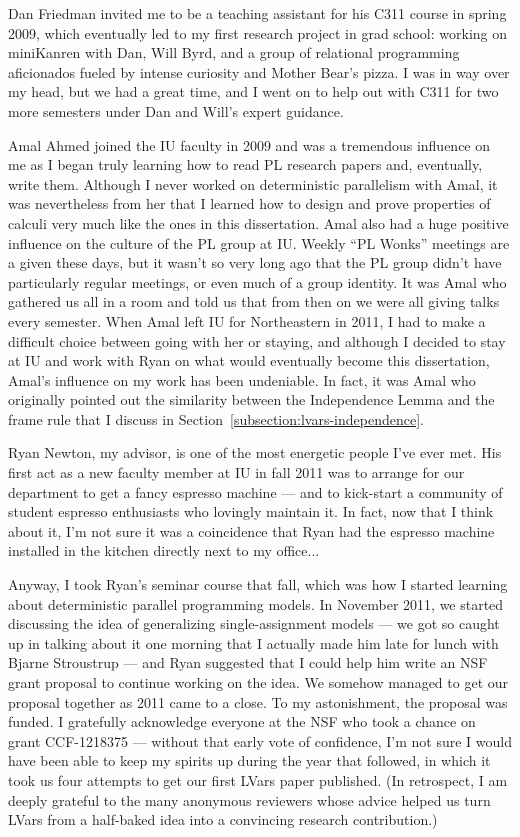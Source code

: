 
Dan Friedman invited me to be a teaching assistant for his C311 course in spring 2009, which eventually led to my first research project in grad school: working on miniKanren with Dan, Will Byrd, and a group of relational programming aficionados fueled by intense curiosity and Mother Bear's pizza.  I was in way over my head, but we had a great time, and I went on to help out with C311 for two more semesters under Dan and Will's expert guidance.

Amal Ahmed joined the IU faculty in 2009 and was a tremendous influence on me as I began truly learning how to read PL research papers and, eventually, write them.  Although I never worked on deterministic parallelism with Amal, it was nevertheless from her that I learned how to design and prove properties of calculi very much like the ones in this dissertation.  Amal also had a huge positive influence on the culture of the PL group at IU.  Weekly ``PL Wonks'' meetings are a given these days, but it wasn't so very long ago that the PL group didn't have particularly regular meetings, or even much of a group identity.  It was Amal who gathered us all in a room and told us that from then on we were all giving talks every semester.  When Amal left IU for Northeastern in 2011, I had to make a difficult choice between going with her or staying, and although I decided to stay at IU and work with Ryan on what would eventually become this dissertation, Amal's influence on my work has been undeniable.  In fact, it was Amal who originally pointed out the similarity between the Independence Lemma and the frame rule that I discuss in Section~\ref{subsection:lvars-independence}.

Ryan Newton, my advisor, is one of the most energetic people I've ever met.  His first act as a new faculty member at IU in fall 2011 was to arrange for our department to get a fancy espresso machine --- and to kick-start a community of student espresso enthusiasts who lovingly maintain it.  In fact, now that I think about it, I'm not sure it was a coincidence that Ryan had the espresso machine installed in the kitchen directly next to my office...

Anyway, I took Ryan's seminar course that fall, which was how I started learning about deterministic parallel programming models.  In November 2011, we started discussing the idea of generalizing single-assignment models --- we got so caught up in talking about it one morning that I actually made him late for lunch with Bjarne Stroustrup --- and Ryan suggested that I could help him write an NSF grant proposal to continue working on the idea.  We somehow managed to get our proposal together as 2011 came to a close.  To my astonishment, the proposal was funded.  I gratefully acknowledge everyone at the NSF who took a chance on grant CCF-1218375 --- without that early vote of confidence, I'm not sure I would have been able to keep my spirits up during the year that followed, in which it took us four attempts to get our first LVars paper published.  (In retrospect, I am deeply grateful to the many anonymous reviewers whose advice helped us turn LVars from a half-baked idea into a convincing research contribution.)

